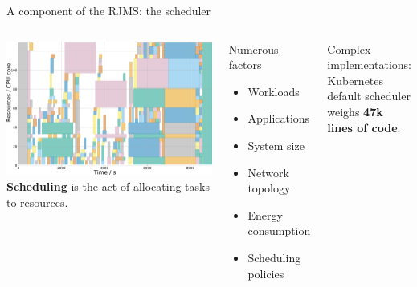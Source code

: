 \documentclass[12pt, aspectratio=43]{beamer}
\begin{document}
\begin{frame}{A component of the RJMS: the scheduler}
	\begin{columns}
		\includegraphics[width=\textwidth]{../imgs/gantt_small.png}
		\textbf{Scheduling} is the act of allocating tasks to resources.

		\begin{block}{Numerous factors}
			\begin{itemize}
				\item Workloads
				\item Applications
				\item System size
				\item Network topology
				\item Energy consumption
				\item Scheduling policies
			\end{itemize}
		\end{block}

		Complex implementations: Kubernetes default
		scheduler weighs \textbf{47k lines of code}.
	\end{columns}
\end{frame}
\end{document}
